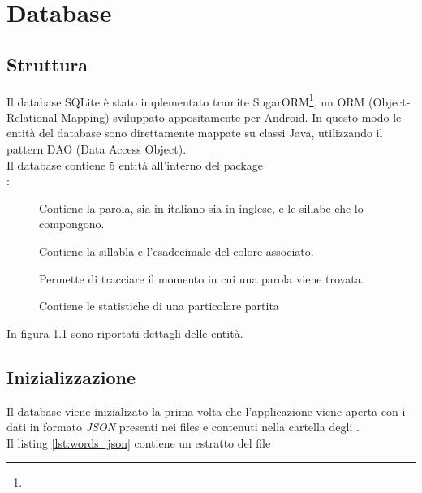 


\chapter{Database}

\section{Struttura}
\label{structure}
Il database SQLite è stato implementato tramite SugarORM\footnote{}, un ORM (Object-Relational Mapping) sviluppato appositamente per Android. In questo modo le entità del database sono direttamente mappate su classi Java, utilizzando il pattern DAO (Data Access Object).\\
Il database contiene 5 entità all'interno del package \\:
\begin{description}
	\item[] Contiene la parola, sia in italiano sia in inglese, e le sillabe che lo compongono.
	\item[] Contiene la sillabla e l'esadecimale del colore associato.
	\item[] Permette di tracciare il momento in cui una parola viene trovata.
	\item[] Contiene le statistiche di una particolare partita
\end{description}
In figura \ref{fig:entities} sono riportati dettagli delle entità.

\begin{figure}[h!]
\label{fig:entities}
  \centering
  \caption{}
\end{figure}

\section{Inizializzazione}
Il database viene inizializato la prima volta che l'applicazione viene aperta con i dati in formato \textit{JSON} presenti nei files  e  contenuti nella cartella degli .\\
Il listing \ref{lst:words_json} contiene un estratto del file 

